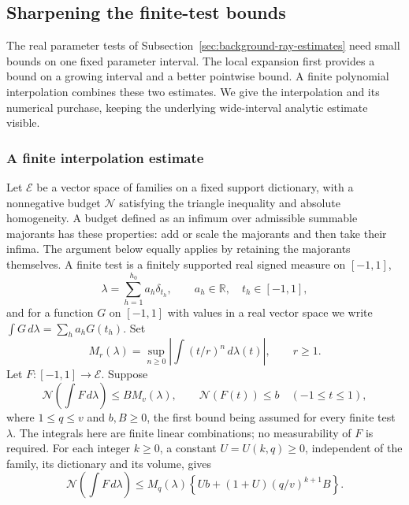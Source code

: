 \subsection{Sharpening the finite-test bounds}
\label{sec:background-test-prices}
The real parameter tests of Subsection~\ref{sec:background-ray-estimates}
need small bounds on one fixed parameter interval. The local expansion
first provides a bound on a growing interval and a better pointwise
bound. A finite polynomial interpolation combines these two estimates.
We give the interpolation and its numerical purchase, keeping the
underlying wide-interval analytic estimate visible.

\subsubsection{A finite interpolation estimate}
Let $\mathcal E$ be a vector space of families on a fixed support
dictionary, with a nonnegative budget $\mathcal N$ satisfying the
triangle inequality and absolute homogeneity. A budget defined as
an infimum over admissible summable majorants has these properties:
add or scale the majorants and then take their infima. The argument
below equally applies by retaining the majorants themselves.
A finite test is a finitely supported real signed measure on
$[-1,1]$,
\[
 \lambda=\sum_{h=1}^{h_0}a_h\delta_{t_h},\qquad a_h\in\mathbb R,
 \quad t_h\in[-1,1],
\]
and for a function $G$ on $[-1,1]$ with values in a real vector
space we write $\int G\,d\lambda=\sum_ha_hG(t_h)$. Set
\[
 M_r(\lambda)=\sup_{n\ge0}\left|\int(t/r)^n\,d\lambda(t)\right|,
                    \qquad r\ge1.
\]
Let $F:[-1,1]\to\mathcal E$. Suppose
\[
 \mathcal N\left(\int F\,d\lambda\right)\le B M_v(\lambda),
 \qquad \mathcal N(F(t))\le b\quad(-1\le t\le1),
\]
where $1\le q\le v$ and $b,B\ge0$, the first bound being assumed
for every finite test $\lambda$. The integrals here are finite
linear combinations; no measurability of $F$ is required.
For each integer $k\ge0$, a constant $U=U(k,q)\ge0$, independent
of the family, its dictionary and its volume, gives
\begin{equation}\label{eq:background-sharp-test}
 \mathcal N\left(\int F\,d\lambda\right)
 \le M_q(\lambda)\left\{Ub+(1+U)(q/v)^{k+1}B\right\}.
\end{equation}

